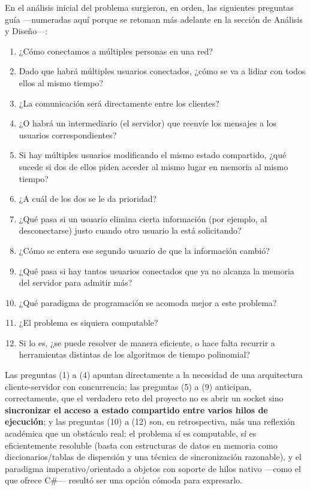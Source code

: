 \documentclass[11pt,letterpaper]{article}
\begin{document}
En el análisis inicial del problema surgieron, en orden, las siguientes
preguntas guía —numeradas aquí porque se retoman más adelante en la sección
de Análisis y Diseño—:

\begin{enumerate}[leftmargin=2.2em]
  \item ¿Cómo conectamos a múltiples personas en una red?
  \item Dado que habrá múltiples usuarios conectados, ¿cómo se va a lidiar
        con todos ellos al mismo tiempo?
  \item ¿La comunicación será directamente entre los clientes?
  \item ¿O habrá un intermediario (el servidor) que reenvíe los mensajes a
        los usuarios correspondientes?
  \item Si hay múltiples usuarios modificando el mismo estado compartido,
        ¿qué sucede si dos de ellos piden acceder al mismo lugar en memoria
        al mismo tiempo?
  \item ¿A cuál de los dos se le da prioridad?
  \item ¿Qué pasa si un usuario elimina cierta información (por ejemplo, al
        desconectarse) justo cuando otro usuario la está solicitando?
  \item ¿Cómo se entera ese segundo usuario de que la información cambió?
  \item ¿Qué pasa si hay tantos usuarios conectados que ya no alcanza la
        memoria del servidor para admitir más?
  \item ¿Qué paradigma de programación se acomoda mejor a este problema?
  \item ¿El problema es siquiera computable?
  \item Si lo es, ¿se puede resolver de manera eficiente, o hace falta
        recurrir a herramientas distintas de los algoritmos de tiempo
        polinomial?
\end{enumerate}

Las preguntas (1) a (4) apuntan directamente a la necesidad de una
arquitectura cliente-servidor con concurrencia; las preguntas (5) a (9)
anticipan, correctamente, que el verdadero reto del proyecto no es abrir un
socket sino \textbf{sincronizar el acceso a estado compartido entre varios
hilos de ejecución}; y las preguntas (10) a (12) son, en retrospectiva,
más una reflexión académica que un obstáculo real: el problema sí es
computable, sí es eficientemente resoluble (basta con estructuras de datos
en memoria como diccionarios/tablas de dispersión y una técnica de
sincronización razonable), y el paradigma imperativo/orientado a objetos
con soporte de hilos nativo —como el que ofrece C\#— resultó ser una
opción cómoda para expresarlo.
\end{document}
